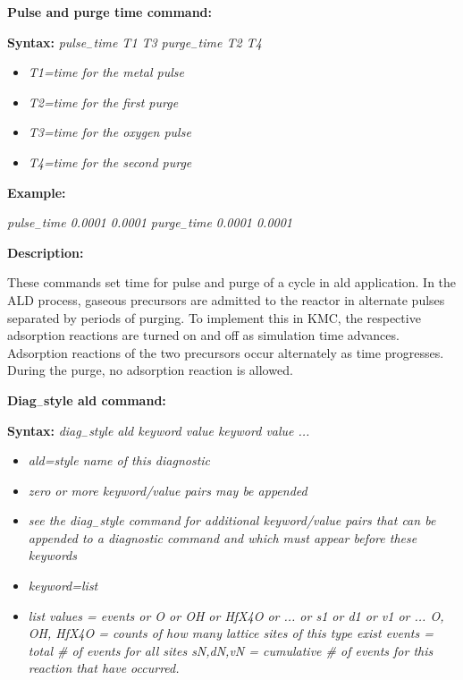 \documentclass[a4paper,12pt]{report}
\begin{document}
\textbf{Pulse and purge time command:}
\newline

\textbf{Syntax:}
\newline
  \emph{pulse$_-$time T1 T3}
\newline
  \emph{purge$_-$time T2 T4}

  \begin{itemize}

  \item \emph{T1=time for the metal pulse}
  \item \emph{T2=time for the first purge}
  \item \emph{T3=time for the oxygen pulse}
  \item \emph{T4=time for the second purge}

  \end{itemize}

\textbf{Example:}

\emph{pulse$_-$time              0.0001  0.0001 
\newline
purge$_-$time              0.0001  0.0001} 
\newline

\textbf{Description:}
\newline

These commands set time for pulse and purge of a cycle in ald application.
In the ALD process, gaseous precursors are admitted to the reactor in alternate
pulses separated by periods of purging. To implement this in KMC, the respective
adsorption reactions are turned on and off as simulation time advances. 
Adsorption reactions of the two precursors occur alternately as time progresses. 
During the purge, no adsorption reaction is allowed.

\textbf{Diag$_-$style ald command:}
\newline

\textbf{Syntax:}
\newline
\emph{diag$_-$style ald keyword value keyword value ...}

  \begin{itemize}

  \item \emph{ald=style name of this diagnostic}
  \item \emph{zero or more keyword/value pairs may be appended}
  \item \emph{see the diag$_-$style command for additional keyword/value pairs that can be appended to a diagnostic command
             and which must appear before these keywords}
  \item \emph{keyword=list}
  \item \emph{list values = events or O or OH or HfX4O or ... or s1 or d1 or v1 or ...
             \newline
             O, OH, HfX4O = counts of how many lattice sites of this type exist
             \newline
             events = total \# of events for all sites
             \newline
             sN,dN,vN = cumulative \# of events for this reaction that have occurred.}

  \end{itemize}
\end{document}
